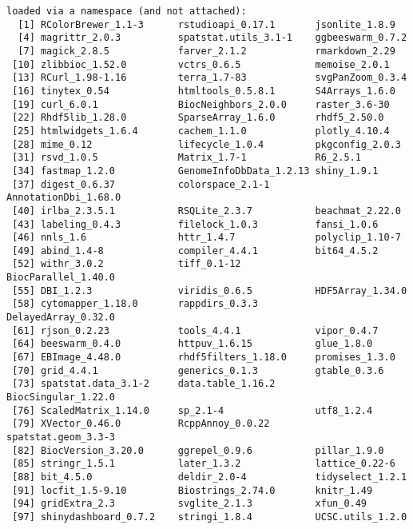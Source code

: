 \documentclass[
  letterpaper,
  DIV=11,
  numbers=noendperiod]{scrreprt}
\begin{document}
\begin{verbatim}
loaded via a namespace (and not attached):
  [1] RColorBrewer_1.1-3      rstudioapi_0.17.1       jsonlite_1.8.9         
  [4] magrittr_2.0.3          spatstat.utils_3.1-1    ggbeeswarm_0.7.2       
  [7] magick_2.8.5            farver_2.1.2            rmarkdown_2.29         
 [10] zlibbioc_1.52.0         vctrs_0.6.5             memoise_2.0.1          
 [13] RCurl_1.98-1.16         terra_1.7-83            svgPanZoom_0.3.4       
 [16] tinytex_0.54            htmltools_0.5.8.1       S4Arrays_1.6.0         
 [19] curl_6.0.1              BiocNeighbors_2.0.0     raster_3.6-30          
 [22] Rhdf5lib_1.28.0         SparseArray_1.6.0       rhdf5_2.50.0           
 [25] htmlwidgets_1.6.4       cachem_1.1.0            plotly_4.10.4          
 [28] mime_0.12               lifecycle_1.0.4         pkgconfig_2.0.3        
 [31] rsvd_1.0.5              Matrix_1.7-1            R6_2.5.1               
 [34] fastmap_1.2.0           GenomeInfoDbData_1.2.13 shiny_1.9.1            
 [37] digest_0.6.37           colorspace_2.1-1        AnnotationDbi_1.68.0   
 [40] irlba_2.3.5.1           RSQLite_2.3.7           beachmat_2.22.0        
 [43] labeling_0.4.3          filelock_1.0.3          fansi_1.0.6            
 [46] nnls_1.6                httr_1.4.7              polyclip_1.10-7        
 [49] abind_1.4-8             compiler_4.4.1          bit64_4.5.2            
 [52] withr_3.0.2             tiff_0.1-12             BiocParallel_1.40.0    
 [55] DBI_1.2.3               viridis_0.6.5           HDF5Array_1.34.0       
 [58] cytomapper_1.18.0       rappdirs_0.3.3          DelayedArray_0.32.0    
 [61] rjson_0.2.23            tools_4.4.1             vipor_0.4.7            
 [64] beeswarm_0.4.0          httpuv_1.6.15           glue_1.8.0             
 [67] EBImage_4.48.0          rhdf5filters_1.18.0     promises_1.3.0         
 [70] grid_4.4.1              generics_0.1.3          gtable_0.3.6           
 [73] spatstat.data_3.1-2     data.table_1.16.2       BiocSingular_1.22.0    
 [76] ScaledMatrix_1.14.0     sp_2.1-4                utf8_1.2.4             
 [79] XVector_0.46.0          RcppAnnoy_0.0.22        spatstat.geom_3.3-3    
 [82] BiocVersion_3.20.0      ggrepel_0.9.6           pillar_1.9.0           
 [85] stringr_1.5.1           later_1.3.2             lattice_0.22-6         
 [88] bit_4.5.0               deldir_2.0-4            tidyselect_1.2.1       
 [91] locfit_1.5-9.10         Biostrings_2.74.0       knitr_1.49             
 [94] gridExtra_2.3           svglite_2.1.3           xfun_0.49              
 [97] shinydashboard_0.7.2    stringi_1.8.4           UCSC.utils_1.2.0       

\end{verbatim}
\end{document}

